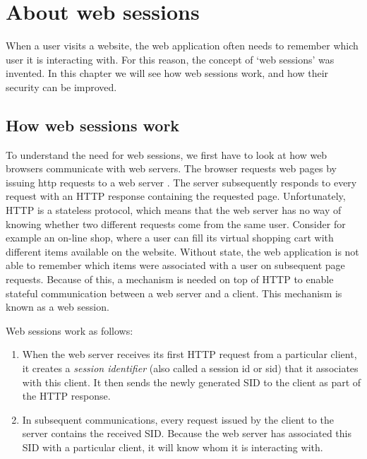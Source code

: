\chapter{About web sessions}

When a user visits a website, the web application often needs to remember which user it is interacting with. For this reason, the concept of `web sessions' was invented. In this chapter we will see how web sessions work, and how their security can be improved.

\section{How web sessions work}\label{session-management}

To understand the need for web sessions, we first have to look at how web browsers communicate with web servers. The browser requests web pages by issuing \gls{http} requests to a web server \cite{Kurose2008}. The server subsequently responds to every request with an HTTP response containing the requested page. Unfortunately, HTTP is a stateless protocol, which means that the web server has no way of knowing whether two different requests come from the same user. Consider for example an on-line shop, where a user can fill its virtual shopping cart with different items available on the website. Without state, the web application is not able to remember which items were associated with a user on subsequent page requests. Because of this, a mechanism is needed on top of HTTP to enable stateful communication between a web server and a client. This mechanism is known as a web session.

Web sessions work as follows:
\begin{enumerate}
	\item When the web server receives its first HTTP request from a particular client, it creates a \emph{session identifier} (also called a \gls{session id} or \gls{sid}) that it associates with this client. It then sends the newly generated SID to the client as part of the HTTP response.
	\item In subsequent communications, every request issued by the client to the server contains the received SID. Because the web server has associated this SID with a particular client, it will know whom it is interacting with.
\end{enumerate}

